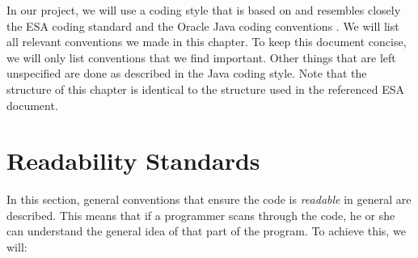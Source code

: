 In our project, we will use a coding style that is based on and resembles closely the ESA coding standard \cite{esa-coding-style} and the Oracle Java coding conventions \cite{oracle-java-coding-style}. We will list all relevant conventions we made in this chapter. To keep this document concise, we will only list conventions that we find important. Other things that are left unspecified are done as described in the Java coding style. Note that the structure of this chapter is identical to the structure used in the referenced ESA document.

\section{Readability Standards}
In this section, general conventions that ensure the code is \emph{readable} in general are described. This means that if a programmer scans through the code, he or she can understand the general idea of that part of the program. To achieve this, we will:

